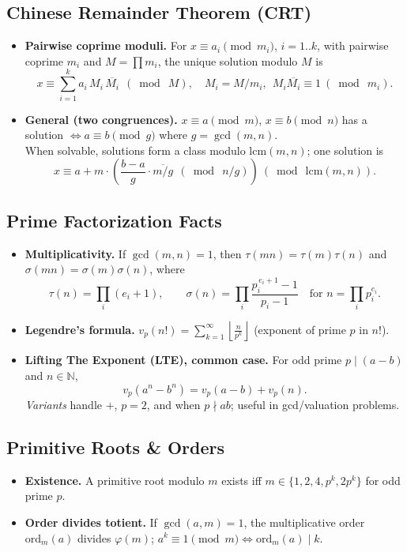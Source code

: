 \documentclass[10pt]{article}
\theoremstyle{definition}
\begin{document}
\subsection{Chinese Remainder Theorem (CRT)}
\begin{itemize}
  \item \textbf{Pairwise coprime moduli.} For $x\equiv a_i\pmod{m_i}$, $i=1..k$, with pairwise coprime $m_i$ and $M=\prod m_i$, the unique solution modulo $M$ is
  \[
    x \equiv \sum_{i=1}^k a_i\,M_i\,\overline{M_i}\ \ (\bmod\ M),\quad M_i=M/m_i,\ \ M_i\overline{M_i}\equiv 1\ (\bmod\ m_i).
  \]
  \item \textbf{General (two congruences).} $x\equiv a\pmod m$, $x\equiv b\pmod n$ has a solution $\iff a\equiv b\pmod{g}$ where $g=\gcd(m,n)$. \\
        When solvable, solutions form a class modulo $\mathrm{lcm}(m,n)$; one solution is
  \[
    x \equiv a + m\cdot \left( \frac{b-a}{g}\cdot \overline{m/g} \ \ (\bmod\ n/g) \right)\ (\bmod\ \mathrm{lcm}(m,n)).
  \]
\end{itemize}

\subsection{Prime Factorization Facts}
\begin{itemize}
  \item \textbf{Multiplicativity.} If $\gcd(m,n)=1$, then $\tau(mn)=\tau(m)\tau(n)$ and $\sigma(mn)=\sigma(m)\sigma(n)$, where
  \[
    \tau(n)=\prod_{i}(e_i+1),\qquad
    \sigma(n)=\prod_{i}\frac{p_i^{\,e_i+1}-1}{p_i-1}\quad\text{for } n=\prod_i p_i^{e_i}.
  \]
  \item \textbf{Legendre's formula.} $v_p(n!)=\displaystyle\sum_{k=1}^{\infty}\left\lfloor \frac{n}{p^k}\right\rfloor$ (exponent of prime $p$ in $n!$).
  \item \textbf{Lifting The Exponent (LTE), common case.} For odd prime $p\mid (a-b)$ and $n\in\mathbb{N}$,
  \[
    v_p(a^n-b^n)=v_p(a-b)+v_p(n).
  \]
  \emph{Variants} handle $+$, $p=2$, and when $p\nmid ab$; useful in gcd/valuation problems.
\end{itemize}

\subsection{Primitive Roots \& Orders}
\begin{itemize}
  \item \textbf{Existence.} A primitive root modulo $m$ exists iff $m\in\{1,2,4,p^k,2p^k\}$ for odd prime $p$.
  \item \textbf{Order divides totient.} If $\gcd(a,m)=1$, the multiplicative order $\mathrm{ord}_m(a)$ divides $\varphi(m)$; $a^k\equiv 1\pmod m \iff \mathrm{ord}_m(a)\mid k$.
\end{itemize}
\end{document}
